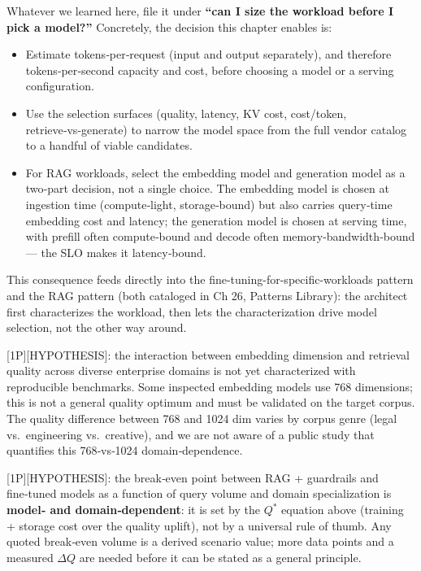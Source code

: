 \label{architecture-consequence}


Whatever we learned here, file it under \textbf{``can I size the
workload before I pick a model?''} Concretely, the decision this chapter
enables is:

\begin{itemize}
\tightlist
\item
  Estimate tokens‑per‑request (input and output separately), and
  therefore tokens‑per‑second capacity and cost, before choosing a model
  or a serving configuration.
\item
  Use the selection surfaces (quality, latency, KV cost, cost/token,
  retrieve‑vs‑generate) to narrow the model space from the full vendor
  catalog to a handful of viable candidates.
\item
  For RAG workloads, select the embedding model and generation model as
  a two‑part decision, not a single choice. The embedding model is
  chosen at ingestion time (compute‑light, storage‑bound) but also
  carries query‑time embedding cost and latency; the generation model is
  chosen at serving time, with prefill often compute‑bound and decode
  often memory‑bandwidth‑bound --- the SLO makes it latency‑bound.
\end{itemize}

This consequence feeds directly into the
fine-tuning-for-specific-workloads pattern and the RAG pattern (both
cataloged in Ch 26, Patterns Library): the architect first characterizes
the workload, then lets the characterization drive model selection, not
the other way around.

\label{what-we-still-dont-know}


\mbox{{[}1P{]}}\hspace{0pt}\mbox{{[}HYPOTHESIS{]}}: the interaction between embedding dimension
and retrieval quality across diverse enterprise domains is not yet
characterized with reproducible benchmarks. Some inspected embedding
models use 768 dimensions; this is not a general quality optimum and
must be validated on the target corpus. The quality difference between
768 and 1024 dim varies by corpus genre (legal vs.~engineering
vs.~creative), and we are not aware of a public study that quantifies
this 768‑vs‑1024 domain‑dependence.

\mbox{{[}1P{]}}\hspace{0pt}\mbox{{[}HYPOTHESIS{]}}: the break‑even point between RAG + guardrails
and fine‑tuned models as a function of query volume and domain
specialization is \textbf{model‑ and domain‑dependent}: it is set by the
\(Q^*\) equation above (training + storage cost over the quality
uplift), not by a universal rule of thumb. Any quoted break‑even volume
is a derived scenario value; more data points and a measured
\(\Delta Q\) are needed before it can be stated as a general principle.

